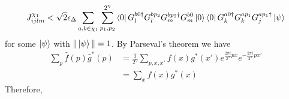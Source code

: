 \documentclass[aps,floatfix,10pt,amssymb,amsfont,amsmath,superscriptaddress,float,nofootinbib,longbibliography,nobalancelastpage,twocolumn]{revtex4-2}
\begin{document}
\begin{equation}
    J_{ijlm}^{\chi_1} <\sqrt{2}\epsilon_{\Delta} \sum_{a,b\in \chi_1} \sum_{p_1,p_2}^{2^{\eta}}\bra{0} G^{b0\dagger}_lG^{bp_2}_lG^{bp_2\dagger}_mG^{b0}_m\ket{0}
    \bra{0}G_k^{a0\dagger}G_k^{ap_1}G_j^{ap_1\dagger}\ket{\psi} 
\end{equation}
for some $\ket{\psi}$ with $\|\ket{\psi}\|=1$. By Parseval's theorem we have
\begin{align}
    \sum_p \hat f(p) \hat g^*(p) &= \frac{1}{2^{\eta}}\sum_{p,x,x'} f(x) g^*(x') e^{\frac{2\pi i}{2^{\eta}}px}e^{-\frac{2\pi i}{2^{\eta}}px'}\\
    &= \sum_{x} f(x) g^*(x) 
\end{align}
Therefore,
\end{document}
